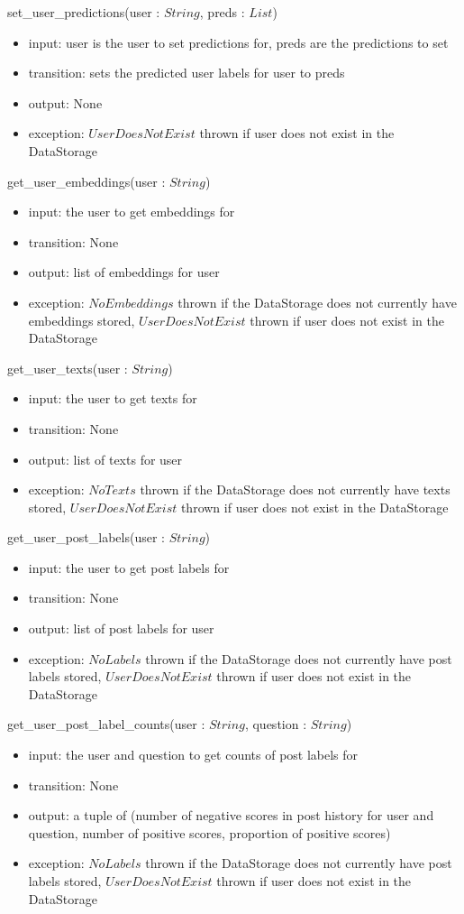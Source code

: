 \documentclass[12pt, titlepage]{article}
\begin{document}
\noindent set\_user\_predictions(user : $String$, preds : $List$)
\begin{itemize}
\item input: user is the user to set predictions for, preds are the predictions to set
\item transition: sets the predicted user labels for user to preds
\item output: None
\item exception: $UserDoesNotExist$ thrown if user does not exist in the DataStorage
\end{itemize}

\noindent get\_user\_embeddings(user : $String$)
\begin{itemize}
\item input: the user to get embeddings for
\item transition: None
\item output: list of embeddings for user
\item exception: $NoEmbeddings$ thrown if the DataStorage does not currently have embeddings stored, $UserDoesNotExist$ thrown if user does not exist in the DataStorage
\end{itemize}

\noindent get\_user\_texts(user : $String$)
\begin{itemize}
\item input: the user to get texts for
\item transition: None
\item output: list of texts for user
\item exception: $NoTexts$ thrown if the DataStorage does not currently have texts stored, $UserDoesNotExist$ thrown if user does not exist in the DataStorage
\end{itemize}

\noindent get\_user\_post\_labels(user : $String$)
\begin{itemize}
\item input: the user to get post labels for
\item transition: None
\item output: list of post labels for user
\item exception: $NoLabels$ thrown if the DataStorage does not currently have post labels stored, $UserDoesNotExist$ thrown if user does not exist in the DataStorage
\end{itemize}

\noindent get\_user\_post\_label\_counts(user : $String$, question : $String$)
\begin{itemize}
\item input: the user and question to get counts of post labels for
\item transition: None
\item output: a tuple of (number of negative scores in post history for user and question, number of positive scores, proportion of positive scores)
\item exception: $NoLabels$ thrown if the DataStorage does not currently have post labels stored, $UserDoesNotExist$ thrown if user does not exist in the DataStorage
\end{itemize}
\end{document}
